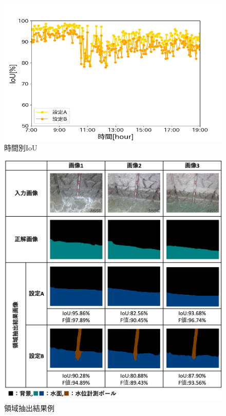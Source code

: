 \begin{figure}[ht] 
  \begin{center}
    \includegraphics[width=\linewidth]{image/0707_IoU.png}
  \end{center}
  \caption{時間別IoU}
  \label{time_IoU_pole}
\end{figure}

\begin{figure}[t] 
  \begin{center}
    \includegraphics[width=\linewidth]{image/image_pole.png}
  \end{center}
  \caption{領域抽出結果例}
  \label{image_pole}
\end{figure}


